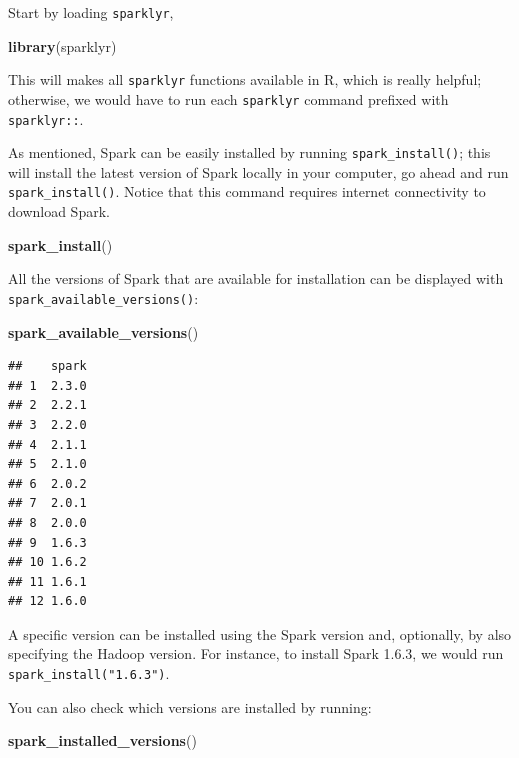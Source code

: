 \documentclass[]{book}
\newenvironment{Shaded}{\begin{snugshade}}{\end{snugshade}}
\newcommand{\KeywordTok}[1]{\textcolor[rgb]{0.13,0.29,0.53}{\textbf{#1}}}
\newcommand{\NormalTok}[1]{#1}
\theoremstyle{definition}
\theoremstyle{definition}
\theoremstyle{definition}
\theoremstyle{remark}
\begin{document}
Start by loading \texttt{sparklyr},

\begin{Shaded}
\begin{Highlighting}[]
\KeywordTok{library}\NormalTok{(sparklyr)}
\end{Highlighting}
\end{Shaded}

This will makes all \texttt{sparklyr} functions available in R, which is
really helpful; otherwise, we would have to run each \texttt{sparklyr}
command prefixed with \texttt{sparklyr::}.

As mentioned, Spark can be easily installed by running
\texttt{spark\_install()}; this will install the latest version of Spark
locally in your computer, go ahead and run \texttt{spark\_install()}.
Notice that this command requires internet connectivity to download
Spark.

\begin{Shaded}
\begin{Highlighting}[]
\KeywordTok{spark_install}\NormalTok{()}
\end{Highlighting}
\end{Shaded}

All the versions of Spark that are available for installation can be
displayed with \texttt{spark\_available\_versions()}:

\begin{Shaded}
\begin{Highlighting}[]
\KeywordTok{spark_available_versions}\NormalTok{()}
\end{Highlighting}
\end{Shaded}

\begin{verbatim}
##    spark
## 1  2.3.0
## 2  2.2.1
## 3  2.2.0
## 4  2.1.1
## 5  2.1.0
## 6  2.0.2
## 7  2.0.1
## 8  2.0.0
## 9  1.6.3
## 10 1.6.2
## 11 1.6.1
## 12 1.6.0
\end{verbatim}

A specific version can be installed using the Spark version and,
optionally, by also specifying the Hadoop version. For instance, to
install Spark 1.6.3, we would run \texttt{spark\_install("1.6.3")}.

You can also check which versions are installed by running:

\begin{Shaded}
\begin{Highlighting}[]
\KeywordTok{spark_installed_versions}\NormalTok{()}
\end{Highlighting}
\end{Shaded}
\end{document}

